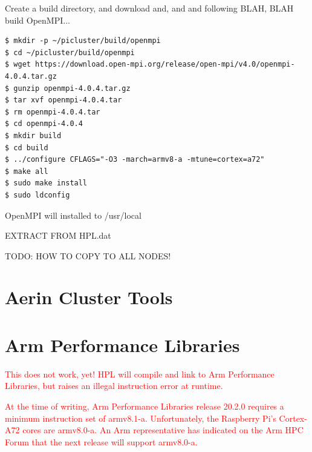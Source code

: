 \documentclass{report}
\begin{document}
Create a build directory, and download and, and and following BLAH, BLAH build OpenMPI...

\lstset{style=type}
\begin{lstlisting}
$ mkdir -p ~/picluster/build/openmpi
$ cd ~/picluster/build/openmpi
$ wget https://download.open-mpi.org/release/open-mpi/v4.0/openmpi-4.0.4.tar.gz
$ gunzip openmpi-4.0.4.tar.gz
$ tar xvf openmpi-4.0.4.tar
$ rm openmpi-4.0.4.tar
$ cd openmpi-4.0.4
$ mkdir build
$ cd build
$ ../configure CFLAGS="-O3 -march=armv8-a -mtune=cortex=a72"
$ make all
$ sudo make install
$ sudo ldconfig
\end{lstlisting}

OpenMPI will installed to /usr/local

EXTRACT FROM HPL.dat


TODO: HOW TO COPY TO ALL NODES!


%
%
\chapter{Aerin Cluster Tools}








%
%

\chapter{Arm Performance Libraries}

\textcolor{red}{This does not work, yet! HPL will compile and link to Arm Performance Libraries, but raises an illegal instruction error at runtime.}

\textcolor{red}{At the time of writing, Arm Performance Libraries release 20.2.0 requires a minimum instruction set of armv8.1-a. Unfortunately, the Raspberry Pi's Cortex-A72 cores are armv8.0-a. An Arm representative has indicated on the Arm HPC Forum that the next release will support armv8.0-a.}
\end{document}
